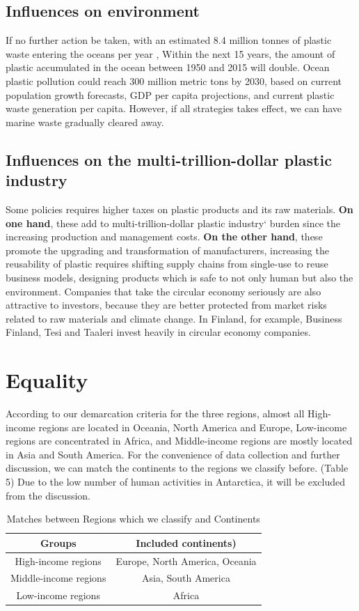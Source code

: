 \documentclass{mcmthesis}
\begin{document}
	 \subsection{Influences on environment}
	 If no further action be taken, with an estimated 8.4 million tonnes of plastic waste entering the oceans per year \cite{jambeck2015plastic}, Within the next 15 years, 
	  the amount of plastic accumulated in the ocean between 1950 and 2015 will double. Ocean plastic pollution could reach 300 million metric tons by 2030, based on 
	 current population growth forecasts, GDP per capita 
	 projections, and current plastic waste generation per 
	 capita.\cite{WWFReport}
	 However, if all strategies takes effect, we can have marine waste gradually cleared away.
	  \subsection{Influences on the multi-trillion-dollar plastic industry}
	  Some policies requires higher taxes on plastic products and its raw materials. \textbf{On one hand}, these add to multi-trillion-dollar plastic industry‘ burden since the increasing production and management costs. \textbf{On the other hand}, these  promote the upgrading and transformation of manufacturers, increasing the reusability of plastic requires shifting supply chains from single-use to reuse business models, designing products which is safe to not only human but also the environment.  
	  Companies that take the circular economy seriously are also attractive to investors, because they are better protected from market risks related to raw materials and climate change. In Finland, for example, Business Finland, Tesi and Taaleri invest heavily in circular economy companies.\cite {Heikki2019circueco}
	 
\section{Equality}
     According to our demarcation criteria for the three regions, almost all High-income regions are located in Oceania, North America and Europe, Low-income regions are concentrated in Africa, and Middle-income regions are mostly located in Asia and South America. For the convenience of data collection and further discussion, we can match the continents to the regions we classify before. (Table 5) Due to the low number of human activities in Antarctica, it will be excluded from the discussion.
	 
	 \begin{table}[H]
		\renewcommand\arraystretch{1.6}
		\centering
		 \caption{Matches between Regions which we classify and Continents }
	   \begin{tabular}{|c|c|}%
		  \hline
		  Groups&Included continents)\\
		  \hline
		  High-income regions&Europe, North America, Oceania\\
		  \hline
		  Middle-income regions&Asia, South America\\
		  \hline
		  Low-income regions&Africa\\
		  \hline
		  \end{tabular}
	  \end{table}
  
\end{document}
